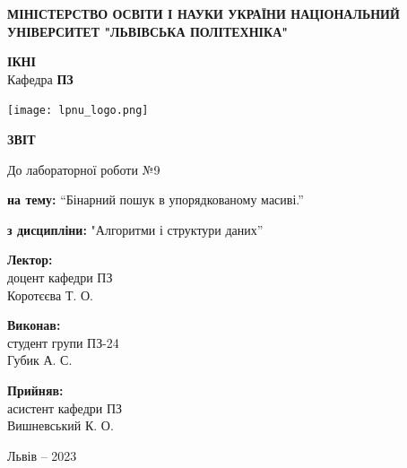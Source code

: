 \documentclass[12pt]{extarticle}
\begin{document}
\begin{titlepage}
    \begin{center}
        \textbf{\normalsize{\MakeUppercase{
            Міністерство Освіти і науки України
            Національний університет "Львівська політехніка"
        }}}

        \begin{flushright}
        \textbf{ІКНІ}\\
        Кафедра \textbf{ПЗ}
        \end{flushright}
        \vspace{15mm}

        \texttt{[image: lpnu\_logo.png]}

        \vspace*{\fill}

        \textbf{\normalsize{\MakeUppercase{Звіт}}}
            
        До лабораторної роботи №9

        \textbf{на тему:} “Бінарний пошук в упорядкованому масиві.”

        \textbf{з дисципліни:} "Алгоритми і структури даних”
            
        \vspace*{\fill}

        \begin{flushright}

            \textbf{Лектор:}\\
            доцент кафедри ПЗ\\
            Коротєєва Т. О.\\
            \vspace{12pt}

            \textbf{Виконав:}\\
            студент групи ПЗ-24\\
            Губик А. С.\\
            \vspace{12pt}

            \textbf{Прийняв:}\\
            асистент кафедри ПЗ\\
            Вишневський К. О.\\
        \vspace{12pt}
        \end{flushright}

        Львів -- 2023
            
            
    \end{center}
\end{titlepage}
\end{document}
